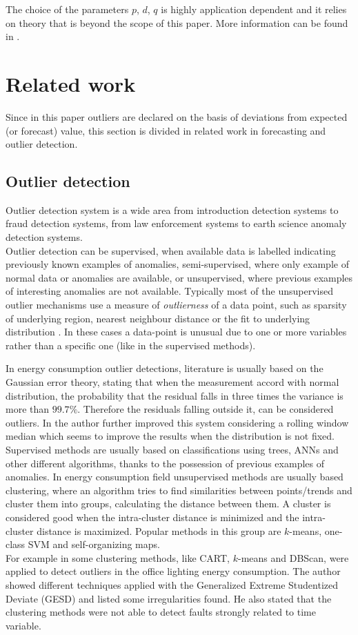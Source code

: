 \documentclass{sig-alternate-sigmod07}
\begin{document}
The choice of the parameters $p$, $d$, $q$ is highly application dependent and it relies on theory that is beyond the scope of this paper. More information can be found in \cite{rousseeuw2005robust}.


\section{Related work}
\label{sec:related}
 Since in this paper outliers are declared on the basis of deviations from expected (or forecast) value, this section is divided in related work in forecasting and outlier detection.


\subsection{Outlier detection}
Outlier detection system is a wide area from introduction detection systems to fraud detection systems, from law enforcement systems to earth science anomaly detection systems.\\
Outlier detection can be supervised, when available data is labelled indicating previously known examples of anomalies, semi-supervised, where only example of normal data or anomalies are available, or unsupervised, where previous examples of interesting anomalies are not available. Typically most of the unsupervised outlier mechanisms use a measure of \emph{outlierness} of a data point, such as sparsity of underlying region, nearest neighbour distance or the fit to underlying distribution \cite{aggarwal2013outlier}. In these cases a data-point is unusual due to one or more variables rather than a specific one (like in the supervised methods).

In energy consumption outlier detections, literature is usually based on the Gaussian error theory, stating that when the measurement accord with normal distribution, the probability that the residual falls in three times the variance is more than $99.7\%$. Therefore the residuals falling outside it, can be considered outliers. 
In \cite{ferdowsi2013neural} the author further improved this system considering a rolling window median which seems to improve the results when the distribution is not fixed. Supervised methods are usually based on classifications using trees, ANNs and other different algorithms, thanks to the possession of previous examples of anomalies. In energy consumption field unsupervised methods are usually based clustering, where an algorithm tries to find similarities between points/trends and cluster them into groups, calculating the distance between them. A cluster is considered good when the intra-cluster distance is minimized and the intra-cluster distance is maximized. Popular methods in this group are $k$-means, one-class SVM and self-organizing maps. \\
For example in \cite{khan2013fault} some clustering methods, like CART, $k$-means and DBScan, were applied to detect outliers in the office lighting energy consumption. The author showed different techniques applied with the Generalized Extreme Studentized Deviate (GESD) and listed some irregularities found. He also stated that the clustering methods were not able to detect faults strongly related to time variable.
\end{document}
